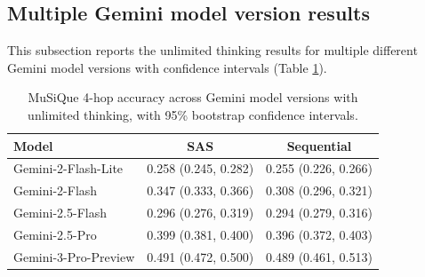 \documentclass{article} %
\begin{document}
\begin{table}[t]
\centering
\caption{Paraphrase results with 95\% bootstrap confidence intervals.}
\label{tab:appendix-paraphrase}
\end{table}

\subsection{Multiple Gemini model version results}
This subsection reports the unlimited thinking results for multiple different Gemini model versions with confidence intervals (Table \ref{tab:appendix-gemini-versions}).

\begin{table}[t]
\centering
\caption{MuSiQue 4-hop accuracy across Gemini model versions with unlimited thinking, with 95\% bootstrap confidence intervals.}
\label{tab:appendix-gemini-versions}
\begin{tabular}{lcc}
\toprule
Model & SAS & Sequential \\
\midrule
Gemini-2-Flash-Lite & 0.258 (0.245, 0.282) & 0.255 (0.226, 0.266) \\
Gemini-2-Flash & 0.347 (0.333, 0.366) & 0.308 (0.296, 0.321) \\
Gemini-2.5-Flash & 0.296 (0.276, 0.319) & 0.294 (0.279, 0.316) \\
Gemini-2.5-Pro & 0.399 (0.381, 0.400) & 0.396 (0.372, 0.403) \\
Gemini-3-Pro-Preview & 0.491 (0.472, 0.500) & 0.489 (0.461, 0.513) \\
\bottomrule
\end{tabular}
\end{table}
\end{document}
